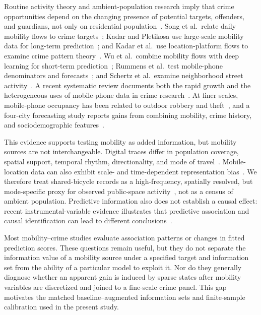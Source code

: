 \documentclass[applsci,article,accept,moreauthors]{Definitions/mdpi}
\begin{document}
Routine activity theory and ambient-population research imply that crime
opportunities depend on the changing presence of potential targets, offenders,
and guardians, not only on residential population~\citep{cohen1979routine,malleson2016ambient}. {Song et al.\ relate daily
mobility flows to crime targets~\citep{song2019legal}; Kadar and Pletikosa
use large-scale mobility data for long-term prediction~\citep{kadar2018mining}; and Kadar et al.\ use location-platform flows to
examine crime pattern theory~\citep{kadar2020mobility}. Wu et al.\ combine
mobility flows with deep learning for short-term prediction~\citep{wu2022mobility}; Rummens et al.\ test mobile-phone denominators and
forecasts~\citep{rummens2021mobile}; and Schertz et al.\ examine neighborhood
street activity~\citep{schertz2021street}.} A recent systematic review documents
both the rapid growth and the heterogeneous uses of mobile-phone data in crime
research~\citep{okmi2023mobile}. At finer scales, mobile-phone occupancy has
been related to outdoor robbery and theft~\citep{valente2024routines}, and a
four-city forecasting study reports gains from combining mobility, crime
history, and sociodemographic features~\citep{albors2025mobility}.

This evidence supports testing mobility as added information, but mobility
sources are not interchangeable. Digital traces differ in population
coverage, spatial support, temporal rhythm, directionality, and mode of travel~\citep{luca2023mobilitysurvey,zhao2024directionality}. Mobile-location data
can also exhibit scale- and time-dependent representation bias~\citep{li2024mobilitybias}. We therefore treat shared-bicycle records as a
high-frequency, spatially resolved, but mode-specific proxy for observed
public-space activity~\citep{xu2023bike,ivanovic2023bike}, not as a census of
ambient population. Predictive information also does not establish a causal
effect: recent instrumental-variable evidence illustrates that predictive
association and causal identification can lead to different conclusions~\citep{vachuska2025causal}.

Most mobility--crime studies evaluate association patterns or changes in
fitted prediction scores. These questions remain useful, but they do not
separate the information value of a mobility source under a specified target
and information set from the ability of a particular model to exploit it.
Nor do they generally diagnose whether an apparent gain is induced by sparse states after mobility
variables are discretized and joined to a fine-scale crime panel. This gap
motivates the matched baseline--augmented information sets and finite-sample
calibration used in the present study.
\end{document}
